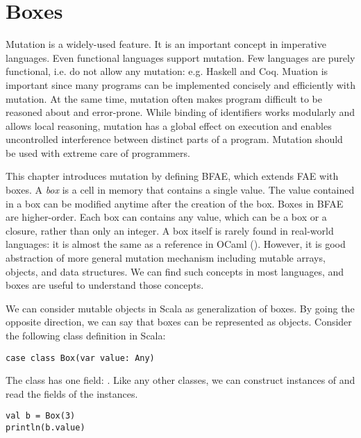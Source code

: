 \setchapterpreamble[u]{\margintoc}
\chapter{Boxes}

\renewcommand{\plang}{\textsf{FAE}\xspace}
\renewcommand{\lang}{\textsf{BFAE}\xspace}

Mutation is a widely-used feature. It is an important concept in imperative
languages. Even functional languages support mutation. Few languages are purely
functional, i.e. do not allow any mutation: e.g. Haskell and Coq. Muation is
important since many programs can be implemented concisely and efficiently with
mutation. At the same time, mutation often makes program difficult to be
reasoned about and error-prone. While binding of identifiers works modularly and
allows local reasoning, mutation has a global effect on execution and enables
uncontrolled interference between distinct parts of a program. Mutation should
be used with extreme care of programmers.

This chapter introduces mutation by defining \lang, which extends \plang with
boxes. A \textit{box} is a cell in memory that contains a single value. The value
contained in a box can be modified anytime after the creation of the box.
Boxes in \lang are higher-order. Each box can contains any value, which can be
a box or a closure, rather than only an integer.
A box itself is rarely found in real-world languages: it is almost the same as
a reference in OCaml (). However, it is good abstraction of more
general mutation mechanism including mutable arrays, objects, and data
structures. We can find such concepts in most languages, and boxes are useful to
understand those concepts.

We can consider mutable objects in Scala as generalization of boxes. By
going the opposite direction, we can say that boxes can be represented as
objects. Consider the following class definition in Scala:

\begin{verbatim}
case class Box(var value: Any)
\end{verbatim}

The class  has one field: . Like any other classes, we can
construct instances of  and read the fields of the instances.

\begin{verbatim}
val b = Box(3)
println(b.value)
\end{verbatim}

